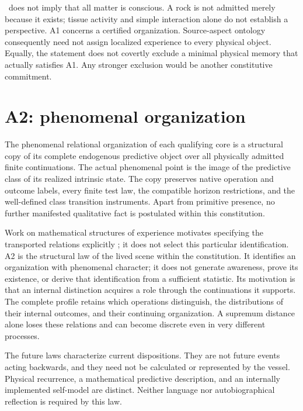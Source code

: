 \spctwo\ does not imply that all matter is conscious. A rock is not admitted merely because it exists; tissue activity and simple interaction alone do not establish a perspective. A1 concerns a certified organization. Source-aspect ontology consequently need not assign localized experience to every physical object. Equally, the statement does not covertly exclude a minimal physical memory that actually satisfies A1. Any stronger exclusion would be another constitutive commitment.

\section{A2: phenomenal organization}\label{section:spc:phenomenal-organization-and-structural-completeness}
\begin{constitution}\label{ax:A2}
The phenomenal relational organization of each qualifying core is a structural copy of its complete endogenous predictive object over all physically admitted finite continuations. The actual phenomenal point is the image of the predictive class of its realized intrinsic state. The copy preserves native operation and outcome labels, every finite test law, the compatible horizon restrictions, and the well-defined class transition instruments. Apart from primitive presence, no further manifested qualitative fact is postulated within this constitution.
\end{constitution}
Work on mathematical structures of experience motivates specifying the transported relations explicitly \cite{Kleiner2023}; it does not select this particular identification. A2 is the structural law of the lived scene within the constitution. It identifies an organization with phenomenal character; it does not generate awareness, prove its existence, or derive that identification from a sufficient statistic. Its motivation is that an internal distinction acquires a role through the continuations it supports. The complete profile retains which operations distinguish, the distributions of their internal outcomes, and their continuing organization. A supremum distance alone loses these relations and can become discrete even in very different processes.

The future laws characterize current dispositions. They are not future events acting backwards, and they need not be calculated or represented by the vessel. Physical recurrence, a mathematical predictive description, and an internally implemented self-model are distinct. Neither language nor autobiographical reflection is required by this law.


